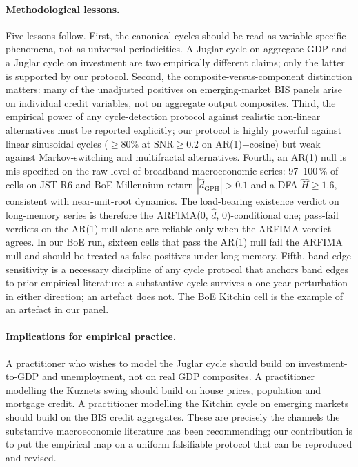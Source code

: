\paragraph{Methodological lessons.}
Five lessons follow. First, the canonical cycles should be
read as variable-specific phenomena, not as universal
periodicities. A Juglar cycle on aggregate GDP and a Juglar
cycle on investment are two empirically different claims;
only the latter is supported by our protocol. Second, the
composite-versus-component distinction \citep{wen2005}
matters: many of the unadjusted positives on emerging-market
BIS panels arise on individual credit variables, not on
aggregate output composites. Third, the empirical power of
any cycle-detection protocol against realistic non-linear
alternatives must be reported explicitly; our protocol is
highly powerful against linear sinusoidal cycles
(\(\geq 80\%\) at \(\mathrm{SNR}\geq 0.2\) on AR(1)+cosine)
but weak against Markov-switching and multifractal
alternatives. Fourth, an AR(1) null is mis-specified on the
raw level of broadband macroeconomic series: 97--100\,\%
of cells on JST R6 and BoE Millennium return
\(|\hat d_{\mathrm{GPH}}|>0.1\) and a DFA
\(\hat H\geq 1.6\), consistent with near-unit-root
dynamics. The load-bearing existence verdict on
long-memory series is therefore the
ARFIMA(0, \(\hat d\), 0)-conditional one; pass-fail
verdicts on the AR(1) null alone are reliable only when
the ARFIMA verdict agrees. In our BoE run, sixteen cells
that pass the AR(1) null fail the ARFIMA null and should
be treated as false positives under long memory. Fifth,
band-edge sensitivity is a necessary discipline of any
cycle protocol that anchors band edges to prior empirical
literature: a substantive cycle survives a one-year
perturbation in either direction; an artefact does not.
The BoE Kitchin cell is the example of an artefact in our
panel.

\paragraph{Implications for empirical practice.}
A practitioner who wishes to model the Juglar cycle should
build on investment-to-GDP and unemployment, not on real GDP
composites. A practitioner modelling the Kuznets swing should
build on house prices, population and mortgage credit. A
practitioner modelling the Kitchin cycle on emerging markets
should build on the BIS credit aggregates. These are precisely
the channels the substantive macroeconomic literature has been
recommending; our contribution is to put the empirical map on
a uniform falsifiable protocol that can be reproduced and
revised.

